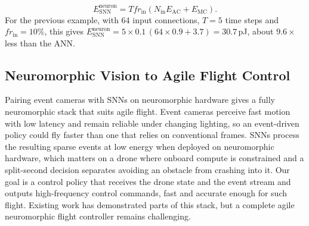 \begin{equation}
    E_{\mathrm{SNN}}^{\mathrm{neuron}} = T fr_{\mathrm{in}} \left( N_{\mathrm{in}} E_{\mathrm{AC}} + E_{\mathrm{MC}} \right).
    \label{eq:energy_snn_neuron_improved}
\end{equation}
For the previous example, with 64 input connections, $T=5$ time steps and $fr_{\mathrm{in}}=10\%$, this gives $E_{\mathrm{SNN}}^{\mathrm{neuron}} = 5 \times 0.1\,(64 \times 0.9 + 3.7) = 30.7$\,pJ, about $9.6\times$ less than the ANN.

\subsection{Neuromorphic Vision to Agile Flight Control}
Pairing event cameras with SNNs on neuromorphic hardware gives a fully neuromorphic stack that suits agile flight. Event cameras perceive fast motion with low latency and remain reliable under changing lighting, so an event-driven policy could fly faster than one that relies on conventional frames. SNNs process the resulting sparse events at low energy when deployed on neuromorphic hardware, which matters on a drone where onboard compute is constrained and a split-second decision separates avoiding an obstacle from crashing into it. Our goal is a control policy that receives the drone state and the event stream and outputs high-frequency control commands, fast and accurate enough for such flight. Existing work has demonstrated parts of this stack, but a complete agile neuromorphic flight controller remains challenging.

